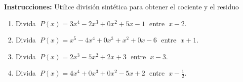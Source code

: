 \documentclass[14pt]{extarticle}
\begin{document}
		\bigskip
	
		\noindent\textbf{Instrucciones:} Utilice división sintética
	para obtener el cociente y el residuo
	
	\begin{enumerate}[label=(\arabic*), start=9]
		\item Divida $\;P(x)=3x^{4}-2x^{3}+0x^{2}+5x-1\;$ entre $\;x-2.$
		\item Divida $\;P(x)=x^{5}-4x^{4}+0x^{3}+x^{2}+0x-6\;$ entre $\;x+1.$
		\item Divida $\;P(x)=2x^{3}-5x^{2}+2x+3\;$ entre $\;x-3.$
		\item Divida $\;P(x)=4x^{4}+0x^{3}+0x^{2}-5x+2\;$ entre $\;x-\tfrac{1}{2}.$
	\end{enumerate}
	
	
	
\end{document}
